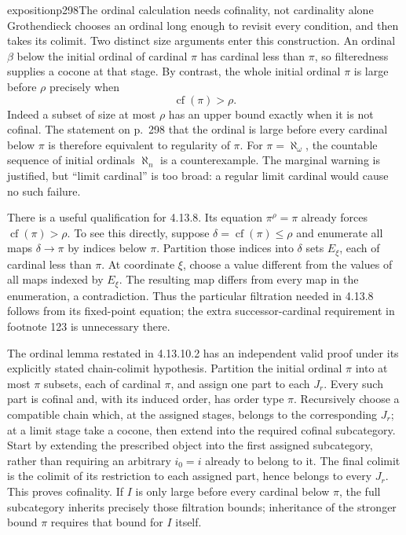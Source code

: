 \begin{dcomment}{exposition}{p298}{The ordinal calculation needs cofinality, not cardinality alone}
Grothendieck chooses an ordinal long enough to revisit every condition, and then takes its colimit. Two distinct size arguments enter this construction. An ordinal $\beta$ below the initial ordinal of cardinal $\pi$ has cardinal less than $\pi$, so filteredness supplies a cocone at that stage. By contrast, the whole initial ordinal $\pi$ is large before $\rho$ precisely when
\[
 \operatorname{cf}(\pi)>\rho.
\]
Indeed a subset of size at most $\rho$ has an upper bound exactly when it is not cofinal. The statement on p.~298 that the ordinal is large before every cardinal below $\pi$ is therefore equivalent to regularity of $\pi$. For $\pi=\aleph_\omega$, the countable sequence of initial ordinals $\aleph_n$ is a counterexample. The marginal warning is justified, but ``limit cardinal'' is too broad: a regular limit cardinal would cause no such failure.

There is a useful qualification for 4.13.8. Its equation $\pi^\rho=\pi$ already forces $\operatorname{cf}(\pi)>\rho$. To see this directly, suppose $\delta=\operatorname{cf}(\pi)\leq\rho$ and enumerate all maps $\delta\to\pi$ by indices below $\pi$. Partition those indices into $\delta$ sets $E_\xi$, each of cardinal less than $\pi$. At coordinate $\xi$, choose a value different from the values of all maps indexed by $E_\xi$. The resulting map differs from every map in the enumeration, a contradiction. Thus the particular filtration needed in 4.13.8 follows from its fixed-point equation; the extra successor-cardinal requirement in footnote 123 is unnecessary there.

The ordinal lemma restated in 4.13.10.2 has an independent valid proof under its explicitly stated chain-colimit hypothesis. Partition the initial ordinal $\pi$ into at most $\pi$ subsets, each of cardinal $\pi$, and assign one part to each $J_r$. Every such part is cofinal and, with its induced order, has order type $\pi$. Recursively choose a compatible chain which, at the assigned stages, belongs to the corresponding $J_r$; at a limit stage take a cocone, then extend into the required cofinal subcategory. Start by extending the prescribed object into the first assigned subcategory, rather than requiring an arbitrary $i_0=i$ already to belong to it. The final colimit is the colimit of its restriction to each assigned part, hence belongs to every $J_r$. This proves cofinality. If $I$ is only large before every cardinal below $\pi$, the full subcategory inherits precisely those filtration bounds; inheritance of the stronger bound $\pi$ requires that bound for $I$ itself.
\end{dcomment}

